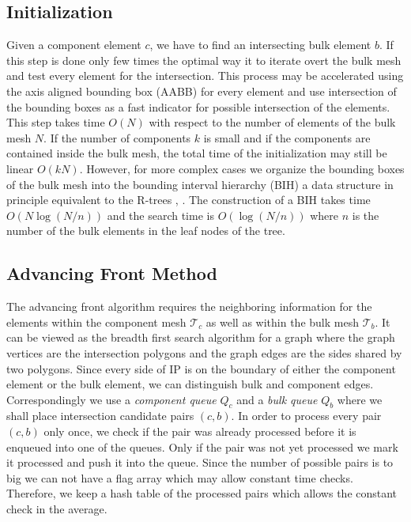 \subsection{Initialization}
\label{sec:initialization}
Given a component element $c$, we have to find an intersecting bulk element $b$.
If this step is done only few times the optimal way it to iterate overt the bulk mesh and test every element for the intersection.
This process may be accelerated using the axis aligned bounding box (AABB) for every element and use intersection of the bounding boxes
as a fast indicator for possible intersection of the elements. This step takes time $O(N)$ with respect to the number of elements of the bulk mesh $N$.
If the number of components $k$ is small and if the components are contained inside the bulk mesh, the total time of the initialization 
may still be linear $O(kN)$. However, for more complex cases we organize the bounding boxes of the bulk mesh into the bounding interval
hierarchy (BIH) \cite{wachter_instant_2006} a data structure in principle equivalent 
to the R-trees \cite{guttman_r_trees_1984}, \cite{nam_comparative_2004}. The construction of a BIH takes time $O(N\log(N/n))$ 
and the search time is $O(\log(N/n))$ where $n$ is the number of the bulk elements in the leaf nodes of the tree.
 
\subsection{Advancing Front Method}
\label{sec:front}
The advancing front algorithm requires the neighboring information for the elements within the component mesh $\mathcal T_c$ 
as well as within the bulk mesh $\mathcal T_b$. It can be viewed as the breadth first search algorithm for a graph where the graph vertices are 
the intersection polygons and the graph edges are the sides shared by two polygons. Since every side of IP is on the boundary of either 
the component element or the bulk element, we can distinguish bulk and component edges. 
Correspondingly we use a \emph{component queue} $Q_c$ and a \emph{bulk queue} $Q_b$ where we shall place intersection candidate pairs $(c,b)$.
In order to process every pair $(c,b)$ only once, we check if the pair was already processed before it is enqueued into one of the queues.
Only if the pair was not yet processed we mark it processed and push it into the queue. Since the number of possible pairs is to big we can not have a flag array
which may allow constant time checks. Therefore, we keep a hash table of the processed pairs which allows the constant check in the average.

